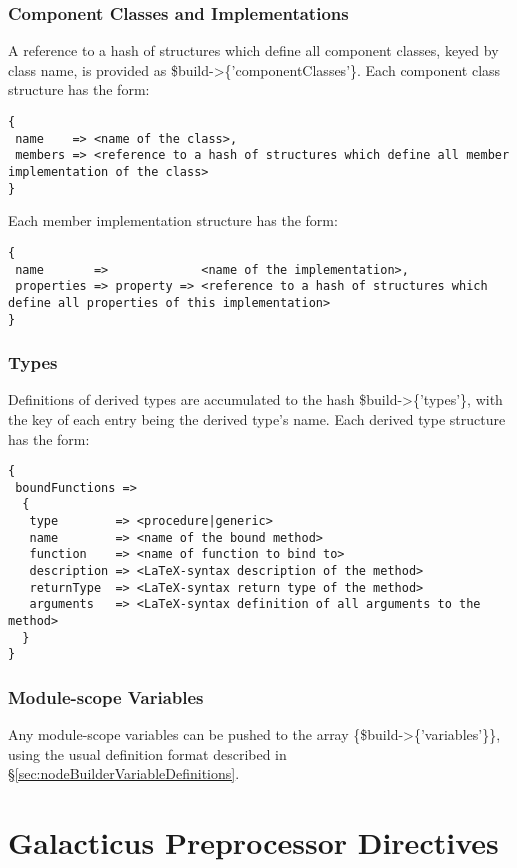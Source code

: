 \subsubsection{Component Classes and Implementations}

A reference to a hash of structures which define all component classes, keyed by class name, is provided as {\normalfont \ttfamily \$build->\{'componentClasses'\}}. Each component class structure has the form:
\begin{verbatim}
{
 name    => <name of the class>,
 members => <reference to a hash of structures which define all member implementation of the class>
}
\end{verbatim}
Each member implementation structure has the form:
\begin{verbatim}
{
 name       =>             <name of the implementation>,
 properties => property => <reference to a hash of structures which define all properties of this implementation>
}
\end{verbatim}

\subsubsection{Types}

Definitions of derived types are accumulated to the hash {\normalfont \ttfamily \$build->\{'types'\}}, with the key of each entry being the derived type's name. Each derived type structure has the form:
\begin{verbatim}
{
 boundFunctions => 
  {
   type        => <procedure|generic>
   name        => <name of the bound method>
   function    => <name of function to bind to>
   description => <LaTeX-syntax description of the method>
   returnType  => <LaTeX-syntax return type of the method>
   arguments   => <LaTeX-syntax definition of all arguments to the method>
  }
}
\end{verbatim}

\subsubsection{Module-scope Variables}

Any module-scope variables can be pushed to the array {\normalfont \ttfamily \@\{\$build->\{'variables'\}\}}, using the usual definition format described in \S\ref{sec:nodeBuilderVariableDefinitions}.

\section{Galacticus Preprocessor Directives}

